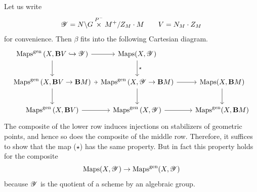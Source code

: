\subsubsection{} Let us write
    \[
    \mathscr{Y} = N \backslash G \overset{P^-}{\times} M^+/Z_M \cdot M
    \qquad
    V = N_M \cdot Z_M
    \]
for convenience. Then $\beta$ fits into the following Cartesian diagram. 
\[
\begin{tikzcd}[
  column sep={12em,between origins},
  row sep={4em,between origins}
]
    \Maps^\gen\left(X, \BB V \mon \YY \right) \arrow[r] \arrow[d] & \Maps(X, \YY) \arrow[d, "\star"] & \\
    \Maps^\gen\left(X, \BB V \to \BB M \right) \arrow[r] \arrow[d] & \Maps^\gen\left(X, \YY \to \BB M \right) \arrow[r] \arrow[d] & \Maps(X, \BB M) \arrow[d] \\
    \Maps^\gen\left(X, \BB V \right) \arrow[r] & \Maps^\gen\left(X, \YY \right) \arrow[r] & \Maps^\gen(X, \BB M)
\end{tikzcd}
\]
The composite of the lower row induces injections on stabilizers of geometric points, and hence so does the composite of the middle row. Therefore, it suffices to show that the map ($\star$) has the same property. But in fact this property holds for the composite
    \[\mathrm{Maps}(X, \mathscr{Y}) \to \mathrm{Maps}^{\mathrm{gen}}(X, \mathscr{Y})\]
because $\mathscr{Y}$ is the quotient of a scheme by an algebraic group.